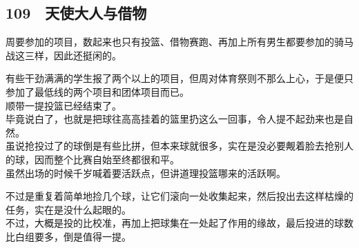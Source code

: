 \subsection{109　天使大人与借物}

周要参加的项目，数起来也只有投篮、借物赛跑、再加上所有男生都要参加的骑马战这三样，因此还挺闲的。

有些干劲满满的学生报了两个以上的项目，但周对体育祭则不那么上心，于是便只参加了最低线的两个项目和团体项目而已。\\

顺带一提投篮已经结束了。\\

毕竟说白了，也就是把球往高高挂着的篮里扔这么一回事，令人提不起劲来也是自然。\\

虽说抢投过了的球倒是有些比拼，但本来球就很多，实在是没必要觍着脸去抢别人的球，因而整个比赛自始至终都很和平。\\

虽然出场的时候千岁喊着要活跃点，但讲道理投篮哪来的活跃啊。

不过是重复着简单地捡几个球，让它们滚向一处收集起来，然后投出去这样枯燥的任务，实在是没什么起眼的。\\

不过，大概是投的比校准，再加上把球集在一处起了作用的缘故，最后投进的球数比白组要多，倒是值得一提。\\

